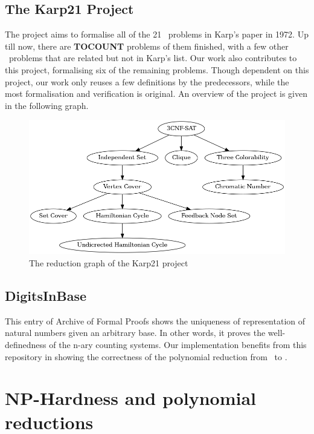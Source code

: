 \subsection*{The Karp21 Project}
The project aims to formalise all of the 21 \NPH\ problems in Karp's paper in 1972. Up till now, there are \textbf{TOCOUNT} problems of them finished, with a few other \NPH\ problems that are related but not in Karp's list. Our work also contributes to this project, formalising six of the remaining problems. Though dependent on this project, our work only reuses a few definitions by the predecessors, while the most formalisation and verification is original. An overview of the project is given in the following graph.
\begin{figure}[h!]
\centering
\includegraphics[scale=0.4]{figures/reductions.png}
\caption{The reduction graph of the Karp21 project}
\end{figure}

\subsection*{DigitsInBase}
This entry of Archive of Formal Proofs shows the uniqueness of representation of natural numbers given an arbitrary base. In other words, it proves the well-definedness of the n-ary counting systems. Our implementation benefits from this repository in showing the correctness of the polynomial reduction from \XC\ to \Part.

\section{NP-Hardness and polynomial reductions}
